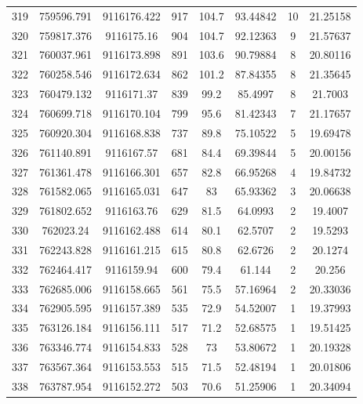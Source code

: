 \begin{longtable}{cccccccc}
319  & 759596.791      & 9116176.422      & 917     & 104.7 & 93.44842 & 10 & 21.25158 \\
320  & 759817.376      & 9116175.16       & 904     & 104.7 & 92.12363 & 9  & 21.57637 \\
321  & 760037.961      & 9116173.898      & 891     & 103.6 & 90.79884 & 8  & 20.80116 \\
322  & 760258.546      & 9116172.634      & 862     & 101.2 & 87.84355 & 8  & 21.35645 \\
323  & 760479.132      & 9116171.37       & 839     & 99.2  & 85.4997  & 8  & 21.7003  \\
324  & 760699.718      & 9116170.104      & 799     & 95.6  & 81.42343 & 7  & 21.17657 \\
325  & 760920.304      & 9116168.838      & 737     & 89.8  & 75.10522 & 5  & 19.69478 \\
326  & 761140.891      & 9116167.57       & 681     & 84.4  & 69.39844 & 5  & 20.00156 \\
327  & 761361.478      & 9116166.301      & 657     & 82.8  & 66.95268 & 4  & 19.84732 \\
328  & 761582.065      & 9116165.031      & 647     & 83    & 65.93362 & 3  & 20.06638 \\
329  & 761802.652      & 9116163.76       & 629     & 81.5  & 64.0993  & 2  & 19.4007  \\
330  & 762023.24       & 9116162.488      & 614     & 80.1  & 62.5707  & 2  & 19.5293  \\
331  & 762243.828      & 9116161.215      & 615     & 80.8  & 62.6726  & 2  & 20.1274  \\
332  & 762464.417      & 9116159.94       & 600     & 79.4  & 61.144   & 2  & 20.256   \\
333  & 762685.006      & 9116158.665      & 561     & 75.5  & 57.16964 & 2  & 20.33036 \\
334  & 762905.595      & 9116157.389      & 535     & 72.9  & 54.52007 & 1  & 19.37993 \\
335  & 763126.184      & 9116156.111      & 517     & 71.2  & 52.68575 & 1  & 19.51425 \\
336  & 763346.774      & 9116154.833      & 528     & 73    & 53.80672 & 1  & 20.19328 \\
337  & 763567.364      & 9116153.553      & 515     & 71.5  & 52.48194 & 1  & 20.01806 \\
338  & 763787.954      & 9116152.272      & 503     & 70.6  & 51.25906 & 1  & 20.34094 \\

\end{longtable}
